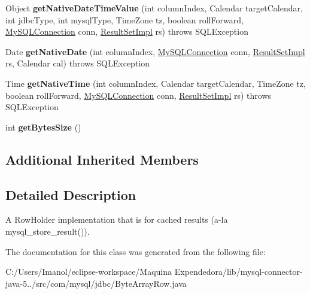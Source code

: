 \begin{DoxyCompactItemize}
\item 
\mbox{\label{classcom_1_1mysql_1_1jdbc_1_1_byte_array_row_abcc7820f541ea49b24ed62c2d8d05480}} 
Object {\bfseries get\+Native\+Date\+Time\+Value} (int column\+Index, Calendar target\+Calendar, int jdbc\+Type, int mysql\+Type, Time\+Zone tz, boolean roll\+Forward, \mbox{\hyperlink{interfacecom_1_1mysql_1_1jdbc_1_1_my_s_q_l_connection}{My\+S\+Q\+L\+Connection}} conn, \mbox{\hyperlink{classcom_1_1mysql_1_1jdbc_1_1_result_set_impl}{Result\+Set\+Impl}} rs)  throws S\+Q\+L\+Exception 
\item 
\mbox{\label{classcom_1_1mysql_1_1jdbc_1_1_byte_array_row_a50185eed17b958eb63bbeb45fe7cd866}} 
Date {\bfseries get\+Native\+Date} (int column\+Index, \mbox{\hyperlink{interfacecom_1_1mysql_1_1jdbc_1_1_my_s_q_l_connection}{My\+S\+Q\+L\+Connection}} conn, \mbox{\hyperlink{classcom_1_1mysql_1_1jdbc_1_1_result_set_impl}{Result\+Set\+Impl}} rs, Calendar cal)  throws S\+Q\+L\+Exception 
\item 
\mbox{\label{classcom_1_1mysql_1_1jdbc_1_1_byte_array_row_a99e7a195ed6b4e1397d6c11daa7073b3}} 
Time {\bfseries get\+Native\+Time} (int column\+Index, Calendar target\+Calendar, Time\+Zone tz, boolean roll\+Forward, \mbox{\hyperlink{interfacecom_1_1mysql_1_1jdbc_1_1_my_s_q_l_connection}{My\+S\+Q\+L\+Connection}} conn, \mbox{\hyperlink{classcom_1_1mysql_1_1jdbc_1_1_result_set_impl}{Result\+Set\+Impl}} rs)  throws S\+Q\+L\+Exception 
\item 
\mbox{\label{classcom_1_1mysql_1_1jdbc_1_1_byte_array_row_acd6e018a1f551b835ae1a6609a98dd24}} 
int {\bfseries get\+Bytes\+Size} ()
\end{DoxyCompactItemize}
\subsection*{Additional Inherited Members}


\subsection{Detailed Description}
A Row\+Holder implementation that is for cached results (a-\/la mysql\+\_\+store\+\_\+result()). 

The documentation for this class was generated from the following file\+:\begin{DoxyCompactItemize}
\item 
C\+:/\+Users/\+Imanol/eclipse-\/workspace/\+Maquina Expendedora/lib/mysql-\/connector-\/java-\/5../src/com/mysql/jdbc/Byte\+Array\+Row.\+java\end{DoxyCompactItemize}
